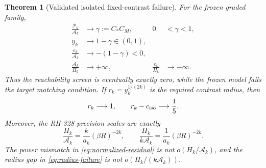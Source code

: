 \documentclass[11pt]{article}
\newtheorem{theorem}{Theorem}[section]
\theoremstyle{remark}
\newcommand{\cA}{\mathcal A}
\newcommand{\cP}{\mathcal P}
\begin{document}
\begin{theorem}[Validated isolated fixed-contrast failure]
\label{thm:no-go}
For the frozen graded family,
\begin{align}
 \frac{\cP_k}{\cA_k}&\longrightarrow\gamma:=C_*C_M,
 &0&<\gamma<1,
 \label{eq:parity-alias-limit}\\
 y_k&\longrightarrow1-\gamma\in(0,1),
 \label{eq:y-limit}\\
 \frac{e_k}{\cA_k}&\longrightarrow-(1-\gamma)<0,
 \label{eq:e-alias-limit}\\
 \frac{\cA_k}{H_k}&\longrightarrow+\infty,
 &\frac{e_k}{H_k}&\longrightarrow-\infty.
 \label{eq:target-divergence}
\end{align}
Thus the reachability screen is eventually exactly zero, while the frozen
model fails the target matching condition.  If
$r_k=y_k^{1/(2k)}$ is the required contrast radius, then
\begin{equation}
 r_k\longrightarrow1,
 \qquad r_k-c_{\rm iso}\longrightarrow\frac15.
 \label{eq:radius-failure}
\end{equation}
Moreover, the RH-328 precision scales are exactly
\begin{equation}
 \frac{H_k}{\cA_k}
 =\frac{k}{a_k}(\beta R)^{-2k},
 \qquad
 \frac{H_k}{k\cA_k}
 =\frac{1}{a_k}(\beta R)^{-2k}.
 \label{eq:precision-scales}
\end{equation}
The power mismatch in \eqref{eq:normalized-residual} is not
$o(H_k/\cA_k)$, and the radius gap in \eqref{eq:radius-failure} is not
$o(H_k/(k\cA_k))$.
\end{theorem}
\end{document}
